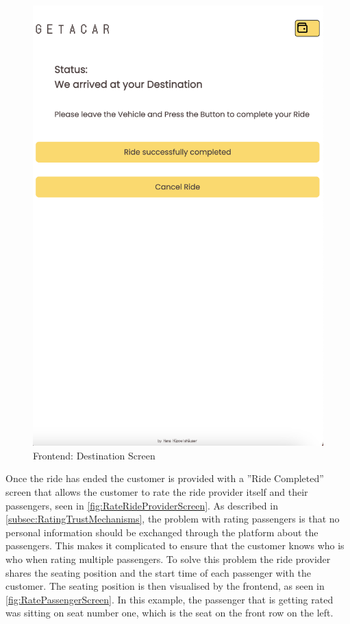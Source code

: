 \begin{figure}[H]
\begin{minipage}{0.45\linewidth}
        \includegraphics[width=\linewidth]{data/ffss/10.png}
        \caption{Frontend: Destination Screen}
        \label{fig:DestinationScreen}
    \end{minipage}
    
\end{figure}

Once the ride has ended the customer is provided with a ''Ride Completed'' screen that allows the customer to rate the ride provider itself and their passengers, seen in \ref{fig:RateRideProviderScreen}. As described in \ref{subsec:RatingTrustMechanisms}, the problem with rating passengers is that no personal information should be exchanged through the platform about the passengers. This makes it complicated to ensure that the customer knows who is who when rating multiple passengers. To solve this problem the ride provider shares the seating position and the start time of each passenger with the customer. The seating position is then visualised by the frontend, as seen in \ref{fig:RatePassengerScreen}. In this example, the passenger that is getting rated was sitting on seat number one, which is the seat on the front row on the left. 



